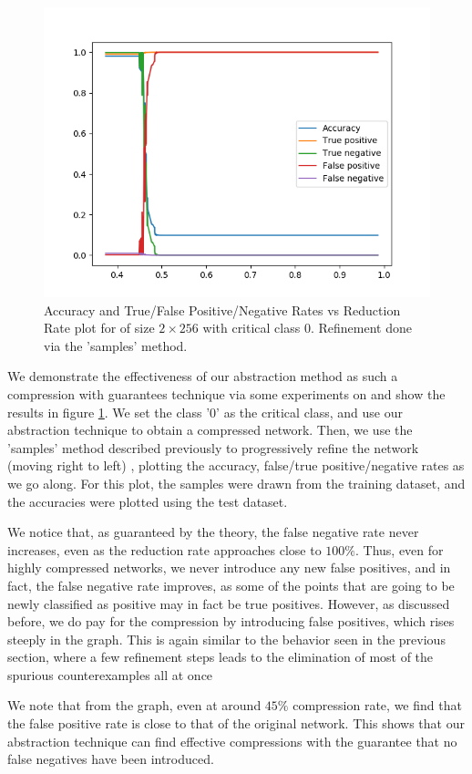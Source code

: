 \begin{figure}
    \includegraphics[scale=0.6]{figs/mnist_2_256_class_samples.png}
    \caption{Accuracy and True/False Positive/Negative Rates vs Reduction Rate
        plot for \mnist of size $2 \times 256$ with critical class 0. Refinement
        done via the 'samples' method.}
    \label{f:mnist-class-samples}
\end{figure}

We demonstrate the effectiveness of our abstraction method as such a compression
with guarantees technique via some experiments on \mnist and show the results in
figure \ref{f:mnist-class-samples}. We set the class '0'
as the critical class, and use our abstraction technique to obtain a compressed
network. Then, we use the 'samples' method described previously to progressively
refine the network (moving right to left) , plotting the accuracy, false/true
positive/negative rates as we go along. For this plot, the samples were drawn
from the \mnist training dataset, and the accuracies were plotted using the
\mnist test dataset.

We notice that, as guaranteed by the theory, the false negative rate never
increases, even as the reduction rate approaches close to $100\%$. Thus, even
for highly compressed networks, we never introduce any new false positives, and
in fact, the false negative rate improves, as some of the points that are going
to be newly classified as positive may in fact be true positives. However, as
discussed before, we do pay for the compression by introducing false positives,
which rises steeply in the graph. This is again similar to the behavior seen in
the previous section, where a few refinement steps leads to the elimination of
most of the spurious counterexamples all at once   

We note that from the graph, even at around $45\%$ compression rate,
we find that the false positive rate is close to that of the original network.
This shows that our abstraction technique can find effective compressions with
the guarantee that no false negatives have been introduced.
